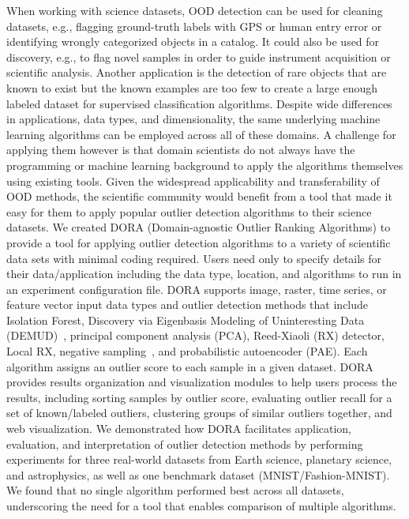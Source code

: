 \documentclass[letterpaper]{article} %
\begin{document}
   When working with science datasets, OOD detection can be used for 
   cleaning datasets, e.g., flagging ground-truth labels with GPS or human
    entry error or identifying wrongly categorized objects in a catalog. 
    It could also be used for discovery, e.g., to flag novel samples in order 
    to guide instrument acquisition or scientific analysis. Another application
   is the detection of rare objects that are known to exist but the known
   examples are too few to create a large enough labeled dataset for 
   supervised classification algorithms. 
  Despite wide differences in applications, data types, and dimensionality,
 the same underlying machine learning algorithms can be employed across 
 all of these domains. A challenge for applying them however is that domain
 scientists do not always have the programming or machine learning background
 to apply the algorithms themselves using existing tools. Given the widespread 
 applicability and transferability of OOD methods, the scientific community 
 would benefit from a tool that made it easy for them to apply popular outlier
 detection algorithms to their science datasets. We created DORA 
 (Domain-agnostic Outlier Ranking Algorithms) 
 to provide a tool for applying outlier 
 detection algorithms to a variety of scientific data sets with minimal coding
 required. Users need only to specify details for their data/application 
 including the data type, location, and algorithms to run in an experiment
 configuration file. DORA supports image, raster, time series, 
or feature vector input data types and outlier detection methods that include
 Isolation Forest, Discovery via Eigenbasis Modeling of Uninteresting Data 
 (DEMUD)~\citep{wagstaff:demud13}, principal component analysis (PCA),
   Reed-Xiaoli (RX) detector,  
 Local RX, negative sampling~\cite{sipple:neg-sampling20}, and probabilistic 
 autoencoder (PAE). 
 Each algorithm assigns an outlier 
 score to each sample in a given dataset. 
 DORA provides results organization and visualization 
 modules to help users process the results, including sorting samples by outlier 
 score, evaluating outlier recall for a set of known/labeled outliers, clustering 
 groups of similar outliers together, and web visualization. 
 We demonstrated how DORA
   facilitates application, evaluation, and interpretation of outlier detection
   methods by performing
    experiments for three real-world datasets from Earth science, planetary
  science, and astrophysics, as well as one benchmark dataset 
  (MNIST/Fashion-MNIST). We found that no single algorithm
      performed best across all datasets, underscoring the need for a tool 
      that enables comparison of multiple algorithms.
\end{document}
